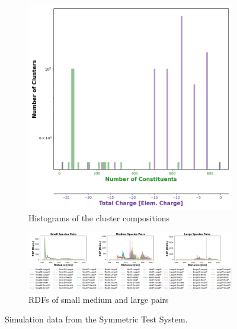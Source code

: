 \documentclass[draft, english]{volcanica-template}
\begin{document}
\begin{figure}[!htbp]
\begin{figure}[!htbp]
\centering
\includegraphics[width=0.7\linewidth]{files/Cluster_Histogram_Fi-73795c297934430f7af65a8078bd2224.png}
\caption[]{Histograms of the cluster compositions}
\label{Fig4_SymTestSys-c}
\end{figure}

\begin{figure}[!htbp]
\centering
\includegraphics[width=0.7\linewidth]{files/Pairwise_RDFs_ij-72a8b569860f09f23097572ea737e4a5.png}
\caption[]{RDFs of small medium and large pairs}
\label{Fig4_SymTestSys-d}
\end{figure}
\caption[]{Simulation data from the Symmetric Test System.}
\label{Fig4_SymTestSys-d}
\end{figure}
\end{document}
